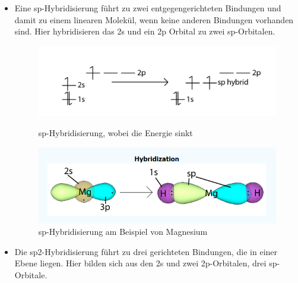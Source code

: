 \documentclass[a4paper, 11pt, ngerman, parskip=half-]{scrartcl}
\begin{document}
\begin{itemize}
    \item Eine sp-Hybridisierung führt zu zwei entgegengerichteten Bindungen und damit
          zu einem linearen Molekül, wenn keine anderen Bindungen vorhanden sind. Hier hybridisieren das 2s und ein 2p Orbital zu zwei sp-Orbitalen.
         
          \begin{figure}[H]
            \begin{minipage}[b]{0.5\linewidth} 
               \includegraphics[width=0.8\linewidth]{resources/28-11-2018/sp11.PNG}
               \caption{sp-Hybridisierung, wobei die Energie sinkt}
            \end{minipage}
            \hspace{0.01\linewidth}
            \begin{minipage}[b]{0.5\linewidth} 
               \includegraphics[width=0.8\linewidth]{resources/28-11-2018/sp12.PNG}
               \caption{sp-Hybridisierung am Beispiel von Magnesium }
            \end{minipage}
         \end{figure}

    \item Die sp2-Hybridisierung führt zu drei gerichteten Bindungen, die in einer
          Ebene liegen. Hier bilden sich aus den 2s und zwei 2p-Orbitalen, drei sp-Orbitale.


\end{itemize}
\end{document}
